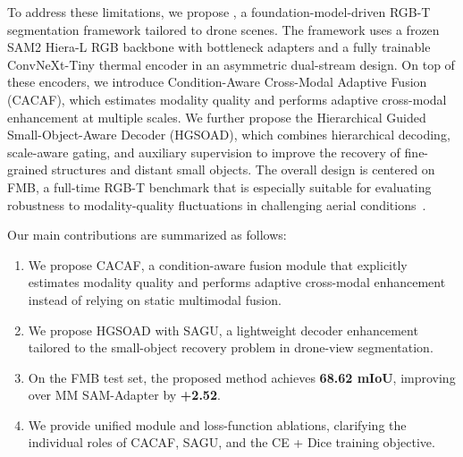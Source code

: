 To address these limitations, we propose \method{}, a foundation-model-driven RGB-T segmentation framework tailored to drone scenes. The framework uses a frozen SAM2 Hiera-L RGB backbone with bottleneck adapters and a fully trainable ConvNeXt-Tiny thermal encoder in an asymmetric dual-stream design. On top of these encoders, we introduce Condition-Aware Cross-Modal Adaptive Fusion (CACAF), which estimates modality quality and performs adaptive cross-modal enhancement at multiple scales. We further propose the Hierarchical Guided Small-Object-Aware Decoder (HGSOAD), which combines hierarchical decoding, scale-aware gating, and auxiliary supervision to improve the recovery of fine-grained structures and distant small objects. The overall design is centered on FMB, a full-time RGB-T benchmark that is especially suitable for evaluating robustness to modality-quality fluctuations in challenging aerial conditions~\cite{liu2023fmb,curti2025mmsamadapter}.

Our main contributions are summarized as follows:
\begin{enumerate}
    \item We propose CACAF, a condition-aware fusion module that explicitly estimates modality quality and performs adaptive cross-modal enhancement instead of relying on static multimodal fusion.
    \item We propose HGSOAD with SAGU, a lightweight decoder enhancement tailored to the small-object recovery problem in drone-view segmentation.
    \item On the FMB test set, the proposed method achieves \textbf{68.62 mIoU}, improving over MM SAM-Adapter by \textbf{+2.52}.
    \item We provide unified module and loss-function ablations, clarifying the individual roles of CACAF, SAGU, and the CE + Dice training objective.
\end{enumerate}
